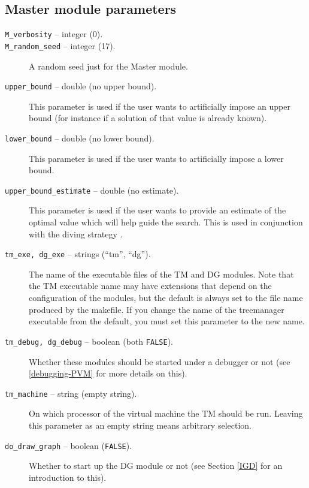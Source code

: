 \subsection{Master module parameters}
\begin{description}

\item[{\tt M\_verbosity} -- integer (0).]

\item[{\tt M\_random\_seed} -- integer (17).]
A random seed just for the Master module.

\item[{\tt upper\_bound} -- double (no upper bound).]
This parameter is used if the user wants to artificially impose an
upper bound (for instance if a solution of that value is already
known).

\item[{\tt lower\_bound} -- double (no lower bound).]
This parameter is used if the user wants to artificially impose a
lower bound.

\label{upper_bound_estimate}
\item[{\tt upper\_bound\_estimate} -- double (no estimate).]
This parameter is used if the user wants to provide an estimate of the
optimal value which will help guide the search. This is used in
conjunction with the diving strategy .

\item[{\tt tm\_exe, dg\_exe} -- strings (``tm'', ``dg'').]
The name of the executable files of the TM and DG modules. Note that
the TM executable name may have extensions that depend on the
configuration of the modules, but the default is always set to the
file name produced by the makefile. If you change the name of the
treemanager executable from the default, you must set this parameter
to the new name.

\item[{\tt tm\_debug, dg\_debug} -- boolean (both {\tt FALSE}).]
Whether these modules should be started under a debugger or not (see
\ref{debugging-PVM} for more details on this).

\item[{\tt tm\_machine} -- string (empty string).]
On which processor of the virtual machine the TM should be run. Leaving this
parameter as an empty string means arbitrary selection.

\item[{\tt do\_draw\_graph} -- boolean ({\tt FALSE}).]
Whether to start up the DG module or not (see Section \ref{IGD} for
an introduction to this).


\end{description}
